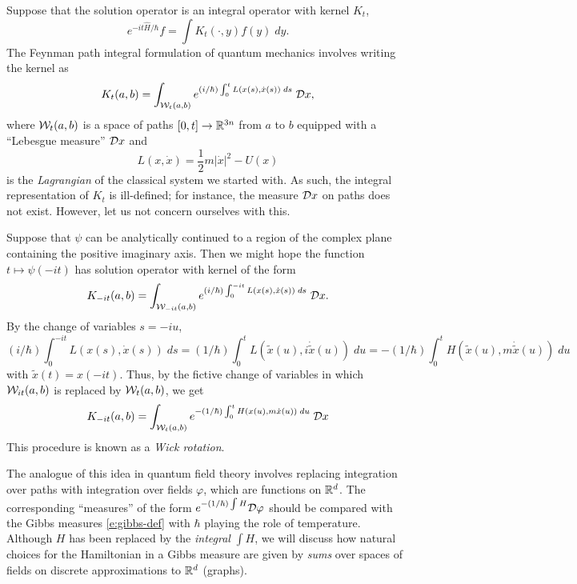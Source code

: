 Suppose that the solution operator is an integral operator with kernel $K_t$,
\begin{equation}
e^{-it\hat H/\hbar} f = \int K_t(\cdot, y) f(y) \; dy.
\end{equation}
The Feynman path integral formulation of quantum mechanics involves writing
the kernel as
\begin{equation}
K_t(a, b)
	=
\int_{\mathcal{W}_t(a, b)} e^{(i/\hbar) \int_0^t L(x(s), \dot x(s)) \; ds} \; \mathcal{D} x,
\end{equation}
where $\mathcal{W}_t(a, b)$ is a space of paths $[0, t] \rightarrow {\mathbb R}^{3n}$ from
$a$ to $b$ equipped with a ``Lebesgue measure'' $\mathcal{D} x$ and
\begin{equation}
L(x, \dot x) = \frac{1}{2} m |\dot x|^2 - U(x)
\end{equation}
is the \emph{Lagrangian} of the classical system we started with.
As such, the integral representation of $K_t$ is ill-defined;
for instance, the measure $\mathcal{D} x$ on paths does not exist. However, let us
not concern ourselves with this.

Suppose that $\psi$ can be analytically continued to a region of the complex
plane containing the positive imaginary axis. Then we might hope the function
$t \mapsto \psi(-it)$ has solution operator with kernel of the form
\begin{equation}
K_{-it}(a, b)
	=
\int_{\mathcal{W}_{-it}(a, b)} e^{(i/\hbar) \int_0^{-it} L(x(s), \dot x(s)) \; ds} \; \mathcal{D} x.
\end{equation}
By the change of variables $s = -iu$,
\begin{equation}
(i/\hbar) \int_0^{-it} L(x(s), \dot x(s)) \; ds
	=
(1/\hbar) \int_0^t L(\tilde x(u), i \dot{\tilde x}(u)) \; du
	=
-(1/\hbar) \int_0^t H(\tilde x(u), m \dot{\tilde x}(u)) \; du
\end{equation}
with $\tilde x(t) = x(-it)$. Thus, by the fictive change of variables in which
$\mathcal{W}_{it}(a, b)$ is replaced by $\mathcal{W}_t(a, b)$, we get
\begin{equation}
\label{e:heat-kernel-fake}
K_{-it}(a, b)
	=
\int_{\mathcal{W}_t(a, b)} e^{-(1/\hbar) \int_0^t H(x(u), m\dot x(u)) \; du} \; \mathcal{D} x
\end{equation}
This procedure is known as a \emph{Wick rotation}.

The analogue of this idea in quantum field theory involves replacing integration
over paths with integration over fields $\varphi$, which are functions on ${ {{\mathbb R}}^d}$.
The corresponding ``measures'' of the form $e^{-(1/\hbar)\int H} \mathcal{D}\varphi$
should be compared with the Gibbs measures \eqref{e:gibbs-def} with $\hbar$ playing
the role of temperature. Although $H$
has been replaced by the \emph{integral} $\int H$, we will discuss how natural
choices for the Hamiltonian in a Gibbs measure are given by \emph{sums} over
spaces of fields on discrete approximations to ${ {{\mathbb R}}^d}$ (graphs).

